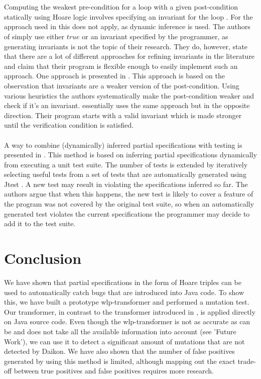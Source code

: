 \documentclass[a4paper, fleqn]{article}
\begin{document}
\\\\
Computing the weakest pre-condition for a loop with a given post-condition statically using Hoare logic involves specifying an invariant for the loop \cite{hoare}. For the approach used in \cite{commentinv} this does not apply, as dynamic inference is used. The authors of \cite{guardedcommands} simply use either $true$ or an invariant specified by the programmer, as generating invariants is not the topic of their research. They do, however, state that there are a lot of different approaches for refining invariants in the literature and claim that their program is flexible enough to easily implement such an approach. One approach is presented in \cite{inferusingpostcond}. This approach is based on the observation that invariants are a weaker version of the post-condition. Using various heuristics the authors systematically make the post-condition weaker and check if it's an invariant. \cite{invondemand} essentially uses the same approach but in the opposite direction. Their program starts with a valid invariant which is made stronger until the verification condition is satisfied.
\\\\
A way to combine (dynamically) inferred partial specifications with testing is presented in \cite{xie}. This method is based on inferring partial specifications dynamically from executing a unit test suite. The number of tests is extended by iteratively selecting useful tests from a set of tests that are automatically generated using Jtest \cite{jtest}. A new test may result in violating the specifications inferred so far. The authors argue that when this happens, the new test is likely to cover a feature of the program was not covered by the original test suite, so when an automatically generated test violates the current specifications the programmer may decide to add it to the test suite.

\section{Conclusion}
We have shown that partial specifications in the form of Hoare triples can be used to automatically catch bugs that are introduced into Java code. To show this, we have built a prototype wlp-transformer and performed a mutation test. Our transformer, in contrast to the transformer introduced in \cite{guardedcommands}, is applied directly on Java source code. Even though the wlp-transformer is not as accurate as can be and does not take all the available information into account (see 'Future Work'), we can use it to detect a significant amount of mutations that are not detected by Daikon. We have also shown that the number of false positives generated by using this method is limited, although mapping out the exact trade-off between true positives and false positives requires more research.
\end{document}
